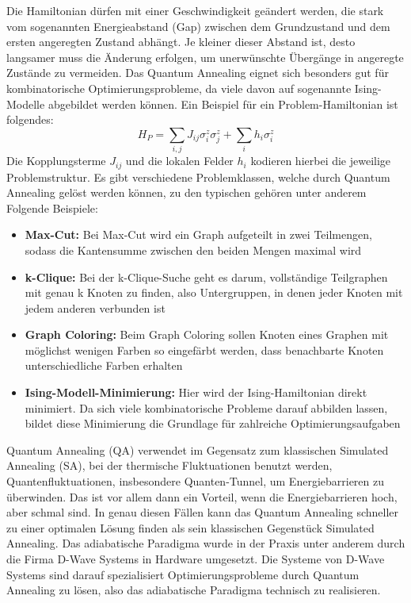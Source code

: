 Die Hamiltonian dürfen mit einer Geschwindigkeit geändert werden, die stark vom sogenannten Energieabstand (Gap) zwischen dem Grundzustand und dem ersten angeregten Zustand abhängt. Je kleiner dieser Abstand ist, desto langsamer muss die Änderung erfolgen, um unerwünschte Übergänge in angeregte Zustände zu vermeiden. 
Das Quantum Annealing eignet sich besonders gut für kombinatorische Optimierungsprobleme, da viele davon auf sogenannte Ising-Modelle abgebildet werden können. Ein Beispiel für ein Problem-Hamiltonian ist folgendes:
$$
H_P = \sum_{i,j} J_{ij}\sigma_i^z\sigma_j^z + \sum_i h_i\sigma_i^z
$$
Die Kopplungsterme $J_{ij}$ und die lokalen Felder $h_i$ kodieren hierbei die jeweilige Problemstruktur.
Es gibt verschiedene Problemklassen, welche durch Quantum Annealing gelöst werden können, zu den typischen gehören unter anderem Folgende Beispiele: 
\begin{itemize}
    \item \textbf{Max-Cut: }Bei Max-Cut wird ein Graph aufgeteilt in zwei Teilmengen, sodass die Kantensumme zwischen den beiden Mengen maximal wird 
    \item 	\textbf{k-Clique:} Bei der k-Clique-Suche geht es darum, vollständige Teilgraphen mit genau k Knoten zu finden, also Untergruppen, in denen jeder Knoten mit jedem anderen verbunden ist 
    \item \textbf{Graph Coloring: }Beim Graph Coloring sollen Knoten eines Graphen mit möglichst wenigen Farben so eingefärbt werden, dass benachbarte Knoten unterschiedliche Farben erhalten 
    \item \textbf{Ising-Modell-Minimierung:} Hier wird der Ising-Hamiltonian direkt minimiert. Da sich viele kombinatorische Probleme darauf abbilden lassen, bildet diese Minimierung die Grundlage für zahlreiche Optimierungsaufgaben 
\end{itemize}
Quantum Annealing (QA) verwendet im Gegensatz zum klassischen Simulated Annealing (SA), bei der thermische Fluktuationen benutzt werden, Quantenfluktuationen, insbesondere Quanten-Tunnel, um Energiebarrieren zu überwinden. Das ist vor allem dann ein Vorteil, wenn die Energiebarrieren hoch, aber schmal sind. In genau diesen Fällen kann das Quantum Annealing schneller zu einer optimalen Lösung finden als sein klassischen Gegenstück Simulated Annealing. 
Das adiabatische Paradigma wurde in der Praxis unter anderem durch die Firma D-Wave Systems in Hardware umgesetzt. Die Systeme von D-Wave Systems sind darauf spezialisiert Optimierungsprobleme durch Quantum Annealing zu lösen, also das adiabatische Paradigma technisch zu realisieren. \autocite[2-4]{rajak_quantum_nodate} \autocite[4-5, 42-43]{albash_adiabatic_2018}
